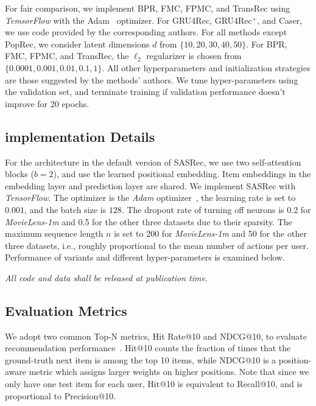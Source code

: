 \documentclass[conference]{IEEEtran}
\begin{document}
For fair comparison, we implement BPR, FMC, FPMC, and TransRec using \emph{TemsorFlow} with the Adam~\cite{DBLP:journals/corr/KingmaB14} optimizer. For GRU4Rec, GRU4Rec$^\text{+}$, and Caser, we use 
code provided by the
corresponding authors. For all methods except PopRec, 
we consider latent dimensions $d$
from $\{10,20,30,40,50\}$. For BPR, FMC, FPMC, and TransRec, the $\ell_2$ regularizer is 
chosen
from $\{0.0001,0.001,0.01,0.1,1\}$. All other hyperparameters and initialization strategies are 
those suggested by the methods' authors.
We tune hyper-parameters using the validation set, and terminate 
training if 
validation performance doesn't improve for 20 epochs.


\subsection{implementation Details}

For the architecture in the default version of SASRec,
we 
use
two
self-attention blocks ($b=2$), and use the learned positional embedding. Item embeddings in the embedding layer and prediction layer are shared.
We implement SASRec with \emph{TensorFlow}. 
The optimizer is the \emph{Adam} optimizer~\cite{DBLP:journals/corr/KingmaB14}, the learning rate is set to $0.001$, and the batch size is $128$. The dropout rate of turning off neurons is 0.2 for \emph{MovieLens-1m} and 0.5 for the other three datasets due to their sparsity. The maximum sequence length $n$ is set to 200 for \emph{MovieLens-1m} and 50 for the other three datasets,
i.e., roughly proportional to the mean number of actions per user.
Performance of variants and different hyper-parameters is examined below.

\emph{All code and data shall be released at publication time}.




\subsection{Evaluation Metrics}

We adopt two common Top-N metrics, Hit Rate@10 and NDCG@10, to evaluate recommendation performance~\cite{NeuMF,DBLP:conf/recsys/HeKM17}.
Hit@10 counts the fraction of times that the ground-truth next item is 
among the
top 10 items, while NDCG@10 is a position-aware metric which assigns larger weights on higher positions. Note that since we only have one test item for each user, Hit@10 is equivalent to Recall@10, and is proportional to Precision@10.
\end{document}
